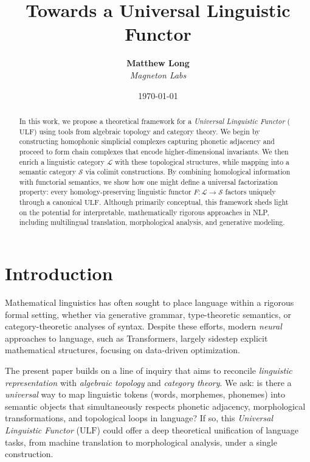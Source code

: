 \documentclass[11pt]{article}
\title{\textbf{Towards a Universal Linguistic Functor}}
\author{
  \textbf{Matthew Long}\\
  \textit{Magneton Labs}
}
\date{\today}
\theoremstyle{definition}
\theoremstyle{remark}
\begin{document}
\maketitle

\begin{abstract}
In this work, we propose a theoretical framework for a \emph{Universal Linguistic Functor} (\(\mathrm{ULF}\)) using tools from algebraic topology and category theory. We begin by constructing homophonic simplicial complexes capturing phonetic adjacency and proceed to form chain complexes that encode higher-dimensional invariants. We then enrich a linguistic category \(\mathcal{L}\) with these topological structures, while mapping into a semantic category \(\mathcal{S}\) via colimit constructions. By combining homological information with functorial semantics, we show how one might define a universal factorization property: every homology-preserving linguistic functor \(F: \mathcal{L}\to \mathcal{S}\) factors uniquely through a canonical \(\mathrm{ULF}\). Although primarily conceptual, this framework sheds light on the potential for interpretable, mathematically rigorous approaches in NLP, including multilingual translation, morphological analysis, and generative modeling.
\end{abstract}

\tableofcontents

\section{Introduction}

Mathematical linguistics has often sought to place language within a rigorous formal setting, whether via generative grammar, type-theoretic semantics, or category-theoretic analyses of syntax. Despite these efforts, modern \emph{neural} approaches to language, such as Transformers, largely sidestep explicit mathematical structures, focusing on data-driven optimization.  

The present paper builds on a line of inquiry that aims to reconcile \emph{linguistic representation} with \emph{algebraic topology} and \emph{category theory}. We ask: is there a \emph{universal} way to map linguistic tokens (words, morphemes, phonemes) into semantic objects that simultaneously respects phonetic adjacency, morphological transformations, and topological loops in language? If so, this \emph{Universal Linguistic Functor} (\(\mathrm{ULF}\)) could offer a deep theoretical unification of language tasks, from machine translation to morphological analysis, under a single construction.  
\end{document}

